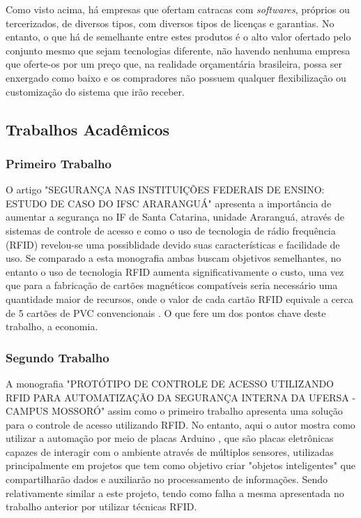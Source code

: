 Como visto acima, há empresas que ofertam catracas com \textit{softwares}, próprios ou tercerizados, de diversos tipos, com diversos tipos de licenças e garantias. No entanto, o que há de semelhante entre estes produtos é o alto valor ofertado pelo conjunto mesmo que sejam tecnologias diferente, não havendo nenhuma empresa que oferte-os por um preço que, na realidade orçamentária brasileira, possa ser enxergado como baixo e os compradores não possuem qualquer flexibilização ou customização do sistema que irão receber. 

\subsection{Trabalhos Acadêmicos}
\subsubsection{Primeiro Trabalho}
O artigo "SEGURANÇA NAS INSTITUIÇÕES FEDERAIS DE ENSINO:
ESTUDO DE CASO DO IFSC ARARANGUÁ" \cite{sifeecia} apresenta a importância de aumentar a segurança no IF de Santa Catarina, unidade Araranguá, através de sistemas de controle de acesso e como o uso de tecnologia de rádio frequência (RFID) revelou-se uma possiblidade devido suas características e facilidade de uso. Se comparado a esta monografia ambas buscam objetivos semelhantes, no entanto o uso de tecnologia RFID aumenta significativamente o custo, uma vez que para a fabricação de cartões magnéticos compatíveis seria necessário uma quantidade maior de recursos, onde o valor de cada cartão RFID \cite{rfid} equivale a cerca de 5 cartões de PVC convencionais \cite{pvc}. O que fere um dos pontos chave deste trabalho, a economia.
\subsubsection{Segundo Trabalho}
A monografia "PROTÓTIPO DE CONTROLE DE ACESSO UTILIZANDO RFID PARA AUTOMATIZAÇÃO DA SEGURANÇA INTERNA DA UFERSA - CAMPUS MOSSORÓ" \cite{asiufersa} assim como o primeiro trabalho apresenta uma solução para o controle de acesso utilizando RFID. No entanto, aqui o autor mostra como utilizar a automação por meio de placas Arduino \cite{arduino}, que são placas eletrônicas capazes de interagir com o ambiente através de múltiplos sensores, utilizadas principalmente em projetos que tem como objetivo criar "objetos inteligentes" que compartilharão dados e auxiliarão no processamento de informações. Sendo relativamente similar a este projeto, tendo como falha a mesma apresentada no trabalho anterior por utilizar técnicas RFID.